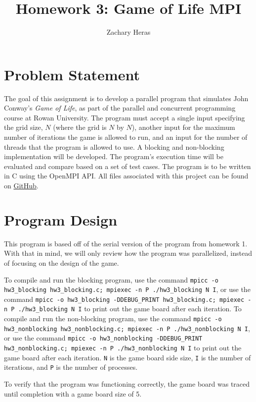 \documentclass{article}
\title{Homework 3: Game of Life MPI}
\author{Zachary Heras}
\begin{document}
	\maketitle
	
	\section{Problem Statement}
	The goal of this assignment is to develop a parallel program that simulates John Conway's \textit{Game of Life}, as part of the parallel and concurrent programming course at Rowan University. The program must accept a single input specifying the grid size, \(N\) (where the grid is \(N\) by \(N\)), another input for the maximum number of iterations the game is allowed to run, and an input for the number of threads that the program is allowed to use. A blocking and non-blocking implementation will be developed. The program's execution time will be evaluated and compare based on a set of test cases. The program is to be written in C using the OpenMPI API. All files associated with this project can be found on \href{https://github.com/ZacharyHeras/parallel_and_concurrent_programming/tree/main/hw3}{GitHub}.

	\section{Program Design}
	This program is based off of the serial version of the program from homework 1. With that in mind, we will only review how the program was parallelized, instead of focusing on the design of the game.
	
	To compile and run the blocking program, use the command \texttt{mpicc -o hw3\_blocking hw3\_blocking.c; mpiexec -n P ./hw3\_blocking N I}, or use the command \texttt{mpicc -o hw3\_blocking -DDEBUG\_PRINT hw3\_blocking.c; mpiexec -n P ./hw3\_blocking N I} to print out the game board after each iteration. To compile and run the non-blocking program, use the command \texttt{mpicc -o hw3\_nonblocking hw3\_nonblocking.c; mpiexec -n P ./hw3\_nonblocking N I}, or use the command \texttt{mpicc -o hw3\_nonblocking -DDEBUG\_PRINT hw3\_nonblocking.c; mpiexec -n P ./hw3\_nonblocking N I} to print out the game board after each iteration. \texttt{N} is the game board side size, \texttt{I} is the number of iterations, and \texttt{P} is the number of processes.
	
	To verify that the program was functioning correctly, the game board was traced until completion with a game board size of 5.
\end{document}
